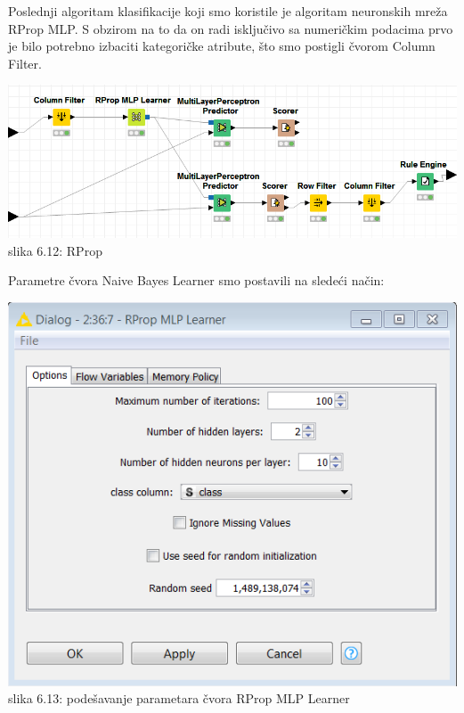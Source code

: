 \documentclass[10pt]{article}
\begin{document}
Poslednji algoritam klasifikacije koji smo koristile je algoritam neuronskih mre\v za RProp MLP. S obzirom na to da on radi isklju\v civo sa numeri\v ckim podacima prvo je bilo potrebno izbaciti kategori\v cke atribute, \v sto smo postigli \v cvorom Column Filter.

\begin{center}
\includegraphics[width = \textwidth,height = 6 cm]{RPROP1}
slika 6.12: RProp\\
\end{center}

Parametre \v cvora Naive Bayes Learner smo postavili na slede\' ci na\v cin:

\begin{center}
\includegraphics[scale = 0.5]{RPROP2}\\
slika 6.13: pode\v savanje parametara \v cvora RProp MLP Learner\\
\end{center}
\end{document}
